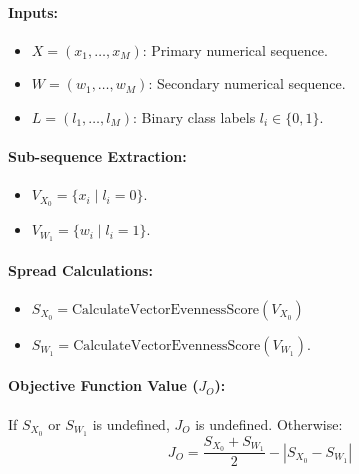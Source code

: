 \documentclass{article}
\begin{document}
\paragraph{Inputs:}
\begin{itemize}
    \item $X = (x_1, \dots, x_M)$: Primary numerical sequence.
    \item $W = (w_1, \dots, w_M)$: Secondary numerical sequence.
    \item $L = (l_1, \dots, l_M)$: Binary class labels $l_i \in \{0, 1\}$.
\end{itemize}

\paragraph{Sub-sequence Extraction:}
\begin{itemize}
    \item $V_{X_0} = \{x_i \mid l_i = 0\}$.
    \item $V_{W_1} = \{w_i \mid l_i = 1\}$.
\end{itemize}

\paragraph{Spread Calculations:}
\begin{itemize}
    \item $S_{X_0} = \text{CalculateVectorEvennessScore}(V_{X_0})$
    \item $S_{W_1} = \text{CalculateVectorEvennessScore}(V_{W_1})$.
\end{itemize}

\paragraph{Objective Function Value ($J_O$):}
If $S_{X_0}$ or $S_{W_1}$ is undefined, $J_O$ is undefined. Otherwise:
$$ J_O = \frac{S_{X_0} + S_{W_1}}{2} - |S_{X_0} - S_{W_1}| $$
\end{document}
